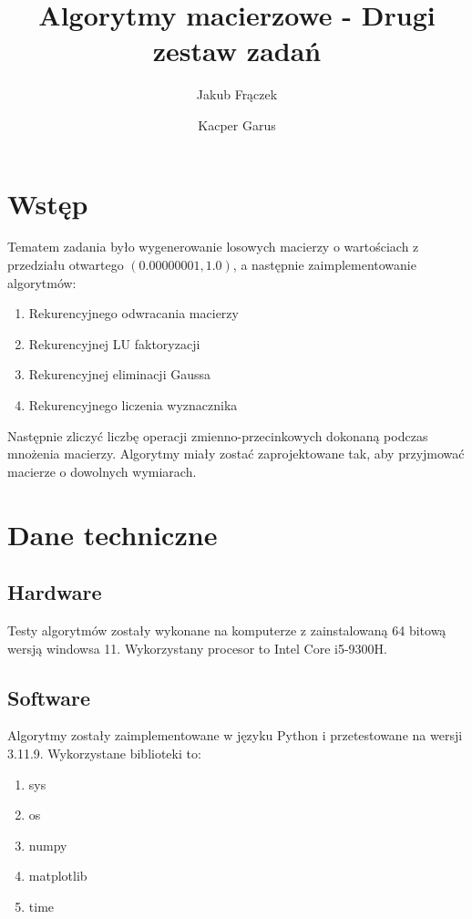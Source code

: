 \documentclass{article}
\title{Algorytmy macierzowe - Drugi zestaw zadań}
\author{Jakub Frączek \and Kacper Garus}
\begin{document}
\sloppy

\maketitle

\tableofcontents

\newpage

\section{Wstęp}

Tematem zadania było wygenerowanie losowych macierzy o wartościach z przedziału otwartego \((0.00000001, 1.0)\), a następnie zaimplementowanie algorytmów:

\begin{enumerate}
    \item Rekurencyjnego odwracania macierzy
    \item Rekurencyjnej LU faktoryzacji
    \item Rekurencyjnej eliminacji Gaussa
    \item Rekurencyjnego liczenia wyznacznika
\end{enumerate}

\noindent
Następnie zliczyć liczbę operacji zmienno-przecinkowych dokonaną podczas mnożenia macierzy. Algorytmy miały zostać zaprojektowane tak, aby przyjmować macierze o dowolnych wymiarach.

\section{Dane techniczne}

\subsection{Hardware}

Testy algorytmów zostały wykonane na komputerze z zainstalowaną 64 bitową wersją windowsa 11. Wykorzystany procesor to Intel Core i5-9300H.

\subsection{Software}

Algorytmy zostały zaimplementowane w języku Python i przetestowane na wersji 3.11.9. Wykorzystane biblioteki to:

\begin{enumerate}
    \item sys
    \item os
    \item numpy
    \item matplotlib
    \item time
\end{enumerate}
\end{document}
